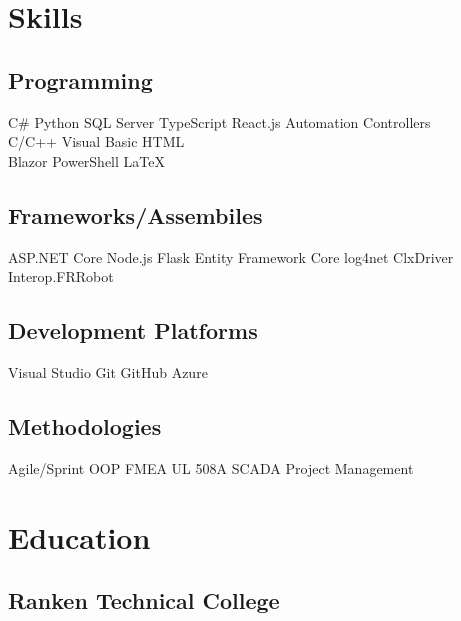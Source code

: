 \documentclass[]{TTurner}
\begin{document}
\hfill
\begin{minipage}[t]{0.25\textwidth} 

\section{Skills}
\subsection{Programming}
\sectionsep
{}
C\# \textbullet{} Python \textbullet{} SQL Server \textbullet{} TypeScript \textbullet{} React.js \textbullet{} Automation Controllers\\
\sectionsep
{}
C/C++ \textbullet{} Visual Basic \textbullet{} HTML\\
Blazor \textbullet{} PowerShell \textbullet{} \LaTeX\\
\sectionsep
\sectionsep
\subsection{Frameworks/Assembiles}
\sectionsep
ASP.NET Core \textbullet{} Node.js \textbullet{} Flask \textbullet{} Entity Framework Core \textbullet{} log4net \textbullet{} ClxDriver \textbullet{} Interop.FRRobot
\sectionsep
\sectionsep
\subsection{Development Platforms}
\sectionsep
Visual Studio \textbullet{} Git \textbullet{} GitHub \textbullet{} Azure\\
\sectionsep
\subsection{Methodologies}
\sectionsep
Agile/Sprint \textbullet{} OOP \textbullet{} FMEA \textbullet{} UL 508A \textbullet{} SCADA \textbullet{} Project Management\\
\sectionsep


\section{Education} 
\subsection{Ranken Technical College}


\end{minipage}
\end{document}
